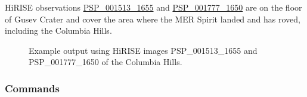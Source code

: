 \ac{HiRISE} observations
\href{http://hirise.lpl.arizona.edu/PSP_001513_1655}{PSP\_001513\_1655} and
\href{http://hirise.lpl.arizona.edu/PSP_001777_1650}{PSP\_001777\_1650}
are on the floor of Gusev Crater and cover the area where the \ac{MER} 
Spirit landed and has roved, including the Columbia Hills.

\begin{figure}[h!]
\centering
  \hfil
\caption{Example output using HiRISE images PSP\_001513\_1655 and
  PSP\_001777\_1650 of the Columbia Hills.}
\label{fig:hirise_chills_example}
\end{figure}

\subsubsection*{Commands}


